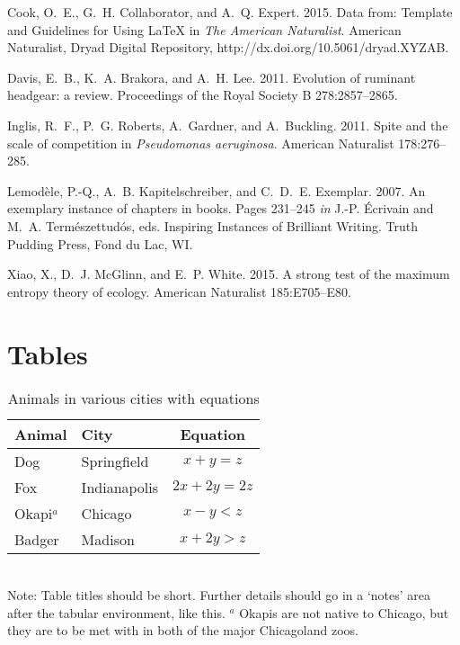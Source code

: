 \documentclass[11pt]{article}
\begin{document}
\begin{thebibliography}{}

Cook, O.~E., G.~H. Collaborator, and A.~Q. Expert. 2015.
\newblock Data from: Template and Guidelines for Using \LaTeX{} in \textit{The American Naturalist}.
\newblock American Naturalist, Dryad Digital Repository, http://dx.doi.org/10.5061/dryad.XYZAB.

Davis, E.~B., K.~A. Brakora, and A.~H. Lee. 2011.
\newblock Evolution of ruminant headgear: a review.
\newblock Proceedings of the Royal Society B 278:2857--2865.

Inglis, R.~F., P.~G. Roberts, A.~Gardner, and A.~Buckling. 2011.
\newblock Spite and the scale of competition in \textit{Pseudomonas
  aeruginosa}.
\newblock American Naturalist 178:276--285.

Lemod\`{e}le, P.-Q., A.~B. Kapitelschreiber, and C.~D.~E. Exemplar. 2007.
\newblock An exemplary instance of chapters in books.
\newblock Pages 231--245 \emph{in} J.-P. \'{E}crivain and M.~A. Term\'{e}szettud\'{o}s, eds. Inspiring Instances of Brilliant Writing. Truth Pudding Press, Fond du Lac, WI.

Xiao, X., D.~J. McGlinn, and E.~P. White. 2015.
\newblock A strong test of the maximum entropy theory of ecology.
\newblock American Naturalist 185:E705--E80.

\end{thebibliography}

\newpage{}

\section*{Tables}
\renewcommand{\thetable}{\arabic{table}}
\setcounter{table}{0}

\begin{table}[h]
\caption{Animals in various cities with equations}
\label{Table:Okapi}
\centering
\begin{tabular}{llc}\hline
Animal    & City         & Equation \\ \hline
Dog       & Springfield  & $x+y=z$ \\
Fox       & Indianapolis & $2x+2y=2z$ \\
Okapi$^a$ & Chicago      & $x-y<z$ \\
Badger    & Madison      & $x+2y>z$ \\ \hline
\end{tabular}
\bigskip{}
\\
{\footnotesize Note: Table titles should be short. Further details should go in a `notes' area after the tabular environment, like this. $^a$ Okapis are not native to Chicago, but they are to be met with in both of the major Chicagoland zoos.}
\end{table}
\end{document}
